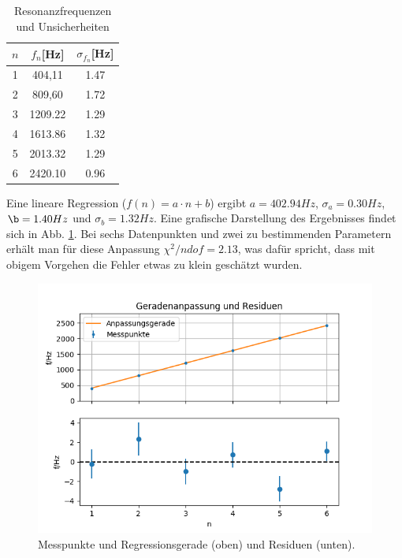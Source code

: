 \documentclass[12pt,a4paper]{article}
\begin{document}
\begin{table}
	\begin{center}
		
		\begin{tabular}{|c|c|c|}
			
			\hline 
			$n$ & $f_n$[Hz] & $\sigma_{f_n}$[Hz] \\ 
			\hline 
			1 & 404,11 & 1.47 \\ 
			\hline 
			2 & 809,60 &  1.72 \\ 
			\hline 
			3 & 1209.22 & 1.29 \\ 
			\hline 
			4 & 1613.86 & 1.32 \\ 
			\hline 
			5 &   2013.32 & 1.29 \\ 
			\hline 
			6 & 2420.10 &     0.96 \\ 
			\hline
		\end{tabular}
		\caption{Resonanzfrequenzen und Unsicherheiten}
		\label{resonanztabelle}
	\end{center}
\end{table} 

Eine lineare Regression ($f(n)=a \cdot n+b$) ergibt $a=402.94 Hz$, $\sigma_a=0.30 Hz$, $\b=1.40 Hz$ und $\sigma_b=1.32 Hz$. Eine grafische Darstellung des Ergebnisses findet sich in Abb. \ref{fig:resonanzregression}.  Bei sechs Datenpunkten und zwei zu bestimmenden Parametern erhält man für diese Anpassung $\chi^2/ndof=2.13$, was dafür spricht, dass mit obigem Vorgehen die Fehler etwas zu klein geschätzt wurden.\\

\begin{figure}
	\includegraphics[width=\linewidth]{fitplot}
	\caption[Auswertung Resonanz]{Messpunkte und Regressionsgerade (oben) und
		Residuen (unten).}
	\label{fig:resonanzregression}
\end{figure}
\end{document}
